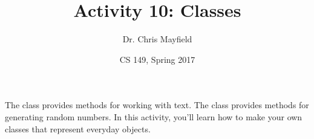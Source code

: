 \documentclass[12pt]{article}
\title{Activity 10: Classes}
\author{Dr. Chris Mayfield}
\date{CS 149, Spring 2017}
\begin{document}
\maketitle

The  class provides methods for working with text. The  class provides methods for generating random numbers. In this activity, you'll learn how to make your own classes that represent everyday objects.







\newpage

%
\end{document}
